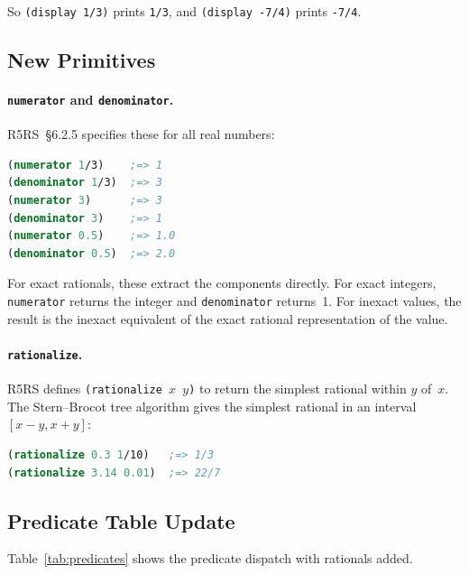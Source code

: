 \documentclass[12pt]{article}
\begin{document}
\noindent So {\tt (display 1/3)} prints {\tt 1/3}, and
{\tt (display -7/4)} prints {\tt -7/4}.

\subsection{New Primitives}

\paragraph{{\tt numerator} and {\tt denominator}.}
R5RS~\S6.2.5 specifies these for all real numbers:

\begin{lstlisting}[language=Scheme]
(numerator 1/3)    ;=> 1
(denominator 1/3)  ;=> 3
(numerator 3)      ;=> 3
(denominator 3)    ;=> 1
(numerator 0.5)    ;=> 1.0
(denominator 0.5)  ;=> 2.0
\end{lstlisting}

\noindent For exact rationals, these extract the components directly.
For exact integers, {\tt numerator} returns the integer and
{\tt denominator} returns~1.  For inexact values, the result is
the inexact equivalent of the exact rational representation of
the value.

\paragraph{{\tt rationalize}.}
R5RS defines {\tt (rationalize $x$ $y$)} to return the simplest
rational within $y$ of~$x$.  The Stern--Brocot tree algorithm
gives the simplest rational in an interval $[x-y, x+y]$:

\begin{lstlisting}[language=Scheme]
(rationalize 0.3 1/10)   ;=> 1/3
(rationalize 3.14 0.01)  ;=> 22/7
\end{lstlisting}

\subsection{Predicate Table Update}

Table~\ref{tab:predicates} shows the predicate dispatch with
rationals added.
\end{document}
